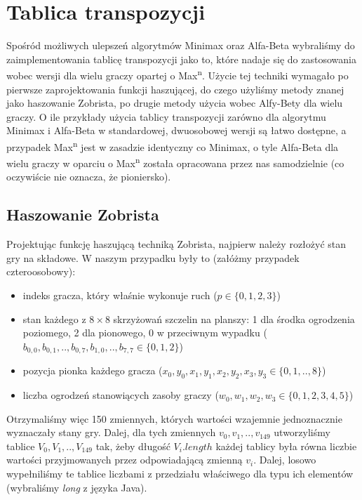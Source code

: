 \documentclass{pracamgr}
\begin{document}
\section{Tablica transpozycji}

Spośród możliwych ulepszeń algorytmów Minimax oraz Alfa-Beta wybraliśmy do zaimplementowania tablicę transpozycji jako to, które nadaje się do zastosowania wobec wersji dla wielu graczy opartej o Max\textsuperscript{n}.
Użycie tej techniki wymagało po pierwsze zaprojektowania funkcji haszującej, do czego użyliśmy metody znanej jako haszowanie Zobrista, po drugie metody użycia wobec Alfy-Bety dla wielu graczy.
O ile przykłady użycia tablicy transpozycji zarówno dla algorytmu Minimax i Alfa-Beta w standardowej, dwuosobowej wersji są łatwo dostępne, a przypadek Max\textsuperscript{n} jest w zasadzie identyczny co Minimax, o tyle Alfa-Beta dla wielu graczy w oparciu o Max\textsuperscript{n} została opracowana przez nas samodzielnie (co oczywiście nie oznacza, że pioniersko).

\subsection{Haszowanie Zobrista}

Projektując funkcję haszującą techniką Zobrista, najpierw należy rozłożyć stan gry na składowe.
W naszym przypadku były to (załóżmy przypadek czteroosobowy):

\begin{itemize}
\item indeks gracza, który właśnie wykonuje ruch (\(p \in \{0, 1, 2, 3\}\))
\item stan każdego z \(8 \times 8\) skrzyżowań szczelin na planszy: 1 dla środka ogrodzenia poziomego, 2 dla pionowego, 0 w przeciwnym wypadku (\( b_{0, 0}, b_{0, 1}, .., b_{0, 7}, b_{1, 0}, .., b_{7, 7} \in \{0, 1, 2\}\))
\item pozycja pionka każdego gracza (\(x_0, y_0, x_1, y_1, x_2, y_2, x_3, y_3 \in \{0, 1, .., 8\}\))
\item liczba ogrodzeń stanowiących zasoby graczy (\(w_0, w_1, w_2, w_3 \in \{0, 1, 2, 3, 4, 5\}\))
\end {itemize}

Otrzymaliśmy więc 150 zmiennych, których wartości wzajemnie jednoznacznie wyznaczały stany gry.
Dalej, dla tych zmiennych \(v_0, v_1, .., v_{149}\) utworzyliśmy tablice \(V_0, V_1, .., V_{149}\) tak, żeby długość \(V_i.length\) każdej tablicy była równa liczbie wartości przyjmowanych przez odpowiadającą zmienną \(v_i\).
Dalej, losowo wypełniliśmy te tablice liczbami z przedziału właściwego dla typu ich elementów (wybraliśmy \emph{long} z języka Java).
\end{document}
